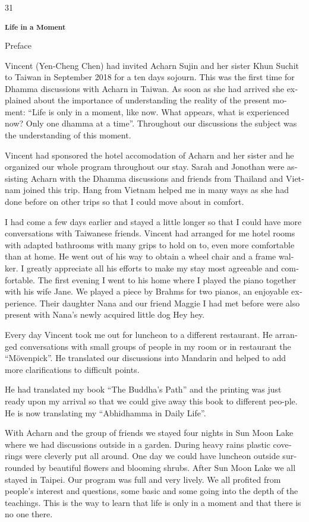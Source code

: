 31

\textsuperscript{\textdutch{\textbf{Life in a Moment}}}

\textdutch{Preface}

\textdutch{Vincent (Yen-Cheng Chen) had invited Acharn Sujin and her
sister Khun Suchit to Taiwan in September 2018 for a ten days sojourn.
This was the first time for Dhamma discussions with Acharn in Taiwan. As
soon as she had arrived she explained about the importance of
understanding the reality of the present moment: ``Life is only in a
moment, like now. What appears, what is experienced now? Only one dhamma
at a time''. Throughout our discussions the subject was the
understanding of this moment. }

\textdutch{Vincent had sponsored the hotel accomodation of Acharn and
her sister and he organized our whole program throughout our stay. Sarah
and Jonothan were assisting Acharn with the Dhamma discussions and
friends from Thailand and Vietnam joined this trip. Hang from Vietnam
helped me in many ways as she had done before on other trips so that I
could move about in comfort. }

\textdutch{I had come a few days earlier and stayed a little longer so
that I could have more conversations with Taiwanese friends. Vincent had
arranged for me hotel rooms with adapted bathrooms with many grips to
hold on to, even more comfortable than at home. He went out of his way
to obtain a wheel chair and a frame walker. I greatly appreciate all his
efforts to make my stay most agreeable and comfortable. The first
evening I went to his home where I played the piano together with his
wife Jane. We played a piece by Brahms for two pianos, an enjoyable
experience. Their daughter Nana and our friend Maggie I had met before
were also present with Nana's newly acquired little dog Hey hey. }

\textdutch{Every day Vincent took me out for luncheon to a different
restaurant. He arranged conversations with small groups of people in my
room or in restaurant the ``Mövenpick''. He translated our discussions
into Mandarin and helped to add more clarifications to difficult
points.}

\textdutch{He had translated my book ``The Buddha's Path'' and the
printing was just ready upon my arrival so that we could give away this
book to different peo-ple. He is now translating my ``Abhidhamma in
Daily Life''. }

\textdutch{With Acharn and the group of friends we stayed four nights in
Sun Moon Lake where we had discussions outside in a garden. During heavy
rains plastic coverings were cleverly put all around. One day we could
have luncheon outside surrounded by beautiful flowers and blooming
shrubs. After Sun Moon Lake we all stayed in Taipei. Our program was
full and very lively. We all profited from people's interest and
questions, some basic and some going into the depth of the teachings.
This is the way to learn that life is only in a moment and that there is
no one there.}

